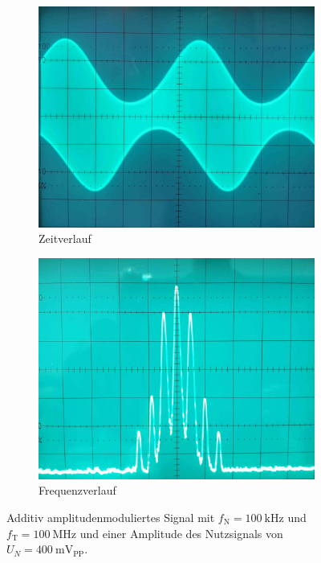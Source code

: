 \documentclass[a4paper,twoside,final]{article}
\begin{document}
\begin{figure}[htp]
    \centering
    \begin{subfigure}{0.45\textwidth}
        \includegraphics[width=\textwidth]{Bilder/AM_400mV_Amplitude.jpg}
        \caption{Zeitverlauf}
    \end{subfigure}\hspace{1cm}
    \begin{subfigure}{0.45\textwidth}
        \includegraphics[width=\textwidth]{Bilder/AM_400mV_Frequenz.jpg}
        \caption{Frequenzverlauf}
    \end{subfigure}
    \caption{Additiv amplitudenmoduliertes Signal mit $f_\text{N} = \SI{100}{\kilo\hertz}$ und $f_\text{T} = \SI{100}{\mega\hertz}$ und einer Amplitude des Nutzsignals von $U_N = \SI{400}{\milli\volt_\text{PP}}$.}
    \label{fig:Modulation_400mV}
\end{figure}\\
\end{document}
